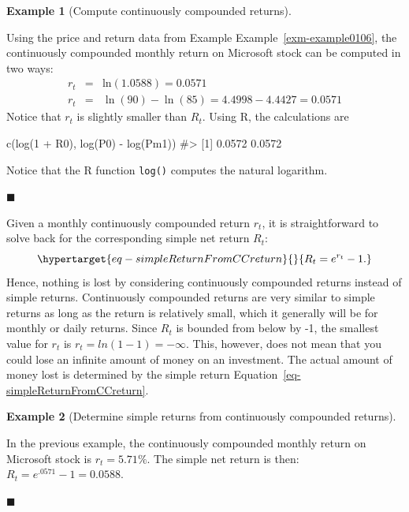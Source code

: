 \documentclass[
  letterpaper,
  DIV=11,
  numbers=noendperiod]{scrreprt}
\newenvironment{Shaded}{\begin{snugshade}}{\end{snugshade}}
\newcommand{\CommentTok}[1]{\textcolor[rgb]{0.37,0.37,0.37}{#1}}
\newcommand{\DecValTok}[1]{\textcolor[rgb]{0.68,0.00,0.00}{#1}}
\newcommand{\FunctionTok}[1]{\textcolor[rgb]{0.28,0.35,0.67}{#1}}
\newcommand{\NormalTok}[1]{\textcolor[rgb]{0.00,0.23,0.31}{#1}}
\newcommand{\SpecialCharTok}[1]{\textcolor[rgb]{0.37,0.37,0.37}{#1}}
\theoremstyle{definition}
\theoremstyle{definition}
\newtheorem{example}{Example}[chapter]
\theoremstyle{remark}
\begin{document}
\begin{example}[Compute continuously compounded
returns]\protect\hypertarget{exm-example0114}{}\label{exm-example0114}

Using the price and return data from Example
Example~\ref{exm-example0106}, the continuously compounded monthly
return on Microsoft stock can be computed in two ways: \begin{eqnarray*}
r_{t} & = & \mathrm{ln}(1.0588)=0.0571\\
r_{t} & = & \mathrm{\ln}(90)-\ln(85)=4.4998-4.4427=0.0571
\end{eqnarray*} Notice that \(r_{t}\) is slightly smaller than
\(R_{t}\). Using R, the calculations are

\end{example}

\begin{Shaded}
\begin{Highlighting}[]
\FunctionTok{c}\NormalTok{(}\FunctionTok{log}\NormalTok{(}\DecValTok{1} \SpecialCharTok{+}\NormalTok{ R0), }\FunctionTok{log}\NormalTok{(P0) }\SpecialCharTok{{-}} \FunctionTok{log}\NormalTok{(Pm1))}
\CommentTok{\#\textgreater{} [1] 0.0572 0.0572}
\end{Highlighting}
\end{Shaded}

Notice that the R function \texttt{log()} computes the natural
logarithm.

\hfill{}\(\blacksquare\)

Given a monthly continuously compounded return \(r_{t}\), it is
straightforward to solve back for the corresponding simple net return
\(R_{t}\):
\begin{equation}\protect\hypertarget{eq-simpleReturnFromCCreturn}{}{
R_{t}=e^{r_{t}}-1.
}\label{eq-simpleReturnFromCCreturn}\end{equation} Hence, nothing is
lost by considering continuously compounded returns instead of simple
returns. Continuously compounded returns are very similar to simple
returns as long as the return is relatively small, which it generally
will be for monthly or daily returns. Since \(R_{t}\) is bounded from
below by -1, the smallest value for \(r_{t}\) is
\(r_{t} = ln(1-1) = -\infty\). This, however, does not mean that you
could lose an infinite amount of money on an investment. The actual
amount of money lost is determined by the simple return
Equation~\ref{eq-simpleReturnFromCCreturn}.

\begin{example}[Determine simple returns from continuously compounded
returns]\protect\hypertarget{exm-example0115}{}\label{exm-example0115}

In the previous example, the continuously compounded monthly return on
Microsoft stock is \(r_{t}=5.71\%\). The simple net return is then:
\(R_{t}=e^{.0571}-1=0.0588.\)

\hfill{}\(\blacksquare\)

\end{example}
\end{document}
